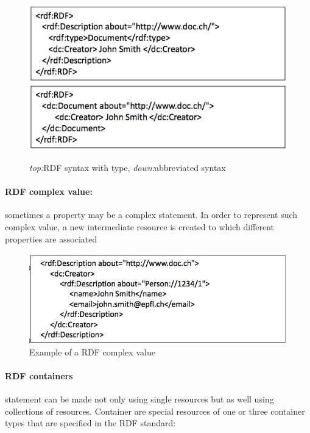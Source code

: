 \begin{figure}[H]
\begin{center}
\includegraphics[width=1\linewidth]{figures/type.png}
\includegraphics[width= 1\linewidth]{figures/abbr.png}
\end{center}
\caption{\textit{top:}RDF syntax with type, \textit{down:}abbreviated syntax}
\end{figure}

\paragraph{RDF complex value:} sometimes a property may be a complex statement. In order to represent such complex value, a new intermediate resource is created to which different properties are associated

\begin{figure}[H]
\begin{center}
\includegraphics[width=1\linewidth]{figures/complexRDF.png}
\end{center}
\caption{Example of a RDF complex value}
\end{figure}

\paragraph{RDF containers}statement can be made not only using single resources but  as well using collections of resources. Container are special resources of one or three container types that are specified in the RDF standard:


